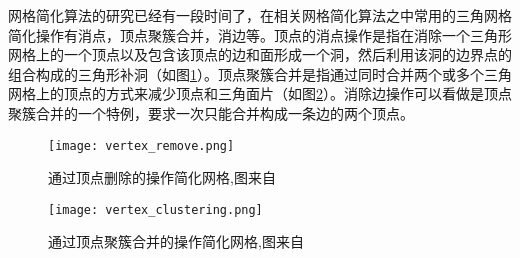 网格简化算法的研究已经有一段时间了，在相关网格简化算法之中常用的三角网格简化操作有消点，顶点聚簇合并，消边等。顶点的消点操作是指在消除一个三角形网格上的一个顶点以及包含该顶点的边和面形成一个洞，然后利用该洞的边界点的组合构成的三角形补洞（如图\ref{fig:rm-vertex}）。顶点聚簇合并是指通过同时合并两个或多个三角网格上的顶点的方式来减少顶点和三角面片（如图\ref{fig:clu-vertex}）。消除边操作可以看做是顶点聚簇合并的一个特例，要求一次只能合并构成一条边的两个顶点。
\begin{figure}[htbp]
    \centering
    \texttt{[image: vertex\_remove.png]}
    \caption{通过顶点删除的操作简化网格,图来自\cite{mesh-simp}}
    \label{fig:rm-vertex}
\end{figure}
\begin{figure}[htbp]
    \centering
    \texttt{[image: vertex\_clustering.png]}
    \caption{通过顶点聚簇合并的操作简化网格,图来自\cite{mesh-simp}}
    \label{fig:clu-vertex}
\end{figure}

